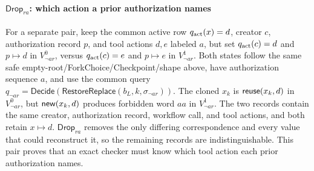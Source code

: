 \paragraph{\(\mathsf{Drop}_{ra}\): which action a prior authorization names}
For a separate pair, keep the common active row \(q_{\rm act}(x)=d\), creator \(c\), authorization record \(p\), and tool actions \(d,e\) labeled \(a\), but set \(q_{\rm act}(c)=d\) and \(p\mapsto d\) in \(V_{\neg ar}^0\), versus \(q_{\rm act}(c)=e\) and \(p\mapsto e\) in \(V_{\neg ar}^1\).
Both states follow the same safe empty-root/ForkChoice/Checkpoint/\Fresh shape above, have authorization sequence \(a\), and use the common query \(q_{\neg ar}=\mathsf{Decide}(\mathsf{RestoreReplace}(b_L,k,\sigma_{\neg ar}))\).
The cloned \(x_k\) is \(\mathsf{reuse}(x_k,d)\) in \(V_{\neg ar}^0\), but \(\mathsf{new}(x_k,d)\) produces forbidden word \(aa\) in \(V_{\neg ar}^1\).
The two records contain the same creator, authorization record, workflow call, and tool actions, and both retain \(x\mapsto d\).
\(\mathsf{Drop}_{ra}\) removes the only differing correspondence and every value that could reconstruct it, so the remaining records are indistinguishable.
This pair proves that an exact checker must know which tool action each prior authorization names.

